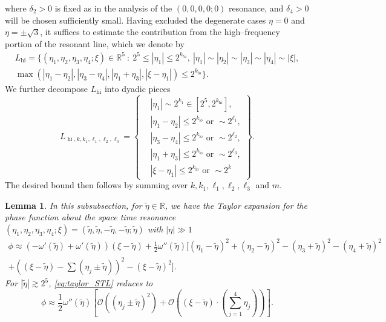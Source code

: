 \documentclass[reqno,english,11pt]{amsart}
\newcommand\R{\mathbb{R}}
\newtheorem{lemma}[theorem]{Lemma}
\theoremstyle{definition}
\numberwithin{equation}{section}
\begin{document}
where $\delta_2>0$ is fixed as in the analysis of the $(0,0,0,0;0)$ resonance, and
$\delta_4>0$ will be chosen sufficiently small.  Having excluded the degenerate cases $\eta=0$ and $\eta=\pm\sqrt{3}$, it suffices to estimate the contribution from the high--frequency portion of
the resonant line, which we denote by
\begin{multline*}
    L_{\operatorname{hi}} = \Big\{ 
(\eta_1, \eta_2, \eta_3, \eta_4; \xi) \in \mathbb{R}^5 \ : \ 
2^5 \le |\eta_1| \le 2^{k_{hi}}, \ 
|\eta_1| \sim |\eta_2| \sim |\eta_3| \sim |\eta_4| \sim |\xi|, \\ 
\max(|\eta_1 - \eta_2|, |\eta_3 - \eta_4|, |\eta_1 + \eta_3|, |\xi - \eta_1|) \le 2^{k_{\operatorname{lo}}} 
\Big\}.
\end{multline*}
We further decompose $L_{\operatorname{hi}}$ into dyadic pieces
$$L_{\operatorname{hi}, k, k_1, \ell_1,\ell_2,\ell_3} = \left\{ 
\begin{aligned}
& |\eta_1| \sim 2^{k_1} \in [2^5, 2^{k_{\operatorname{hi}}}], \\
& |\eta_1 - \eta_2| \le 2^{k_{\operatorname{lo}}} \text{ or } \sim 2^{\ell_1}, \\
& |\eta_3 - \eta_4| \le 2^{k_{\operatorname{lo}}} \text{ or } \sim 2^{\ell_2}, \\
& |\eta_1 + \eta_3| \le 2^{k_{\operatorname{lo}}} \text{ or } \sim 2^{\ell_3}, \\
& |\xi - \eta_1| \le 2^{k_{\operatorname{lo}}} \text{ or } \sim 2^k 
\end{aligned}
\right\}.$$
The desired bound then follows by summing over $k,k_1,\ell_1,\ell_2,\ell_3$ and $m$. 
\begin{lemma}\label{lem:taylor_STL}
    In this subsubsection, for $\tilde{\eta}\in \R$, we have the Taylor expansion for the phase function about the space time resonance $(\eta_1,\eta_2,\eta_3,\eta_4;\xi)=(\tilde{\eta},\tilde{\eta},-\tilde{\eta},-\tilde{\eta};\tilde{\eta})$ with $|\eta|\gg1$ 
    \begin{multline}\label{eq:taylor_STL}
        \phi \approx  \left(-\omega'(\tilde{\eta}) + \omega'(\tilde{\eta})\right)(\xi - \tilde{\eta}) + \frac{1}{2}\omega''(\tilde{\eta}) \bigg[ (\eta_1-\tilde{\eta})^2 + (\eta_2-\tilde{\eta})^2 - (\eta_3+\tilde{\eta})^2 - (\eta_4+\tilde{\eta})^2 \\
 + \left((\xi - \tilde{\eta}) - \sum (\eta_j \pm \tilde{\eta})\right)^2 - (\xi - \tilde{\eta})^2 \bigg].
    \end{multline}
    For $|\tilde{\eta}|\gtrsim 2^5$, \eqref{eq:taylor_STL} reduces to 
    $$\phi \approx \frac{1}{2}\omega''(\tilde{\eta}) \left[ \mathcal{O}\left((\eta_j\pm \tilde{\eta})^2\right) + \mathcal{O}\left((\xi-\tilde{\eta})\cdot (\sum^4_{j=1}\eta_j)\right) \right].$$
\end{lemma}
\end{document}
